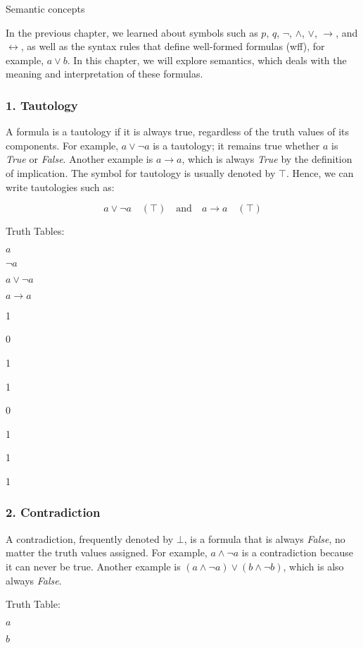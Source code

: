 Semantic concepts

In the previous chapter, we learned about symbols such as \(p\), \(q\),
\(\neg\), \(\land\), \(\lor\), \(\to\), and \(\leftrightarrow\), as well
as the syntax rules that define well-formed formulas (wff), for example,
\(a \lor b\). In this chapter, we will explore semantics, which deals
with the meaning and interpretation of these formulas.

\subsubsection{1. Tautology}\label{tautology}

A formula is a tautology if it is always true, regardless of the truth
values of its components. For example, \(a \lor \neg a\) is a tautology;
it remains true whether \(a\) is \emph{True} or \emph{False}. Another
example is \(a \to a\), which is always \emph{True} by the definition of
implication. The symbol for tautology is usually denoted by \(\top\).
Hence, we can write tautologies such as:

\[
a \lor \neg a \quad (\top) \quad \text{and} \quad a \to a \quad (\top)
\]

Truth Tables:

\(a\)

\(\neg a\)

\(a \lor \neg a\)

\(a \to a\)

1

0

1

1

0

1

1

1

\subsubsection{2. Contradiction}\label{contradiction}

A contradiction, frequently denoted by \(\bot\), is a formula that is
always \emph{False}, no matter the truth values assigned. For example,
\(a \land \neg a\) is a contradiction because it can never be true.
Another example is \((a \land \neg a) \lor (b \land \neg b)\), which is
also always \emph{False}.

Truth Table:

\(a\)

\(b\)

